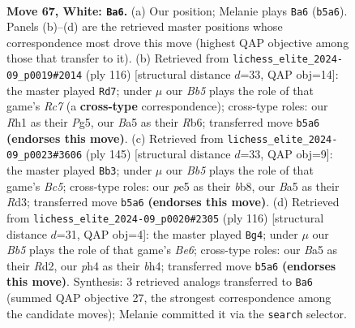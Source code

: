 \documentclass[11pt]{article}
\begin{document}
\clearpage

\begin{figure}[p]\centering
\begin{subfigure}{0.46\textwidth}\centering
\resizebox{\linewidth}{!}{%
\newchessgame
\chessboard[
  setfen={1r6/4b1k1/1n1p3p/BB2p3/4P2p/5P2/5K2/7R w - - 3 67},
  showmover=false,
  pgfstyle=straightmove, color=movearrow, markmove={b5-a6}
]}
\caption{}
\end{subfigure}\hfill
\begin{subfigure}{0.46\textwidth}\centering
\resizebox{\linewidth}{!}{%
\newchessgame
\chessboard[
  setfen={8/2R5/1R1n2p1/p3kpP1/P7/1p1r4/6P1/6K1 w - - 10 59},
  showmover=false,
  pgfstyle=straightmove, color=movearrow, markmove={c7-d7}
]}
\caption{}
\end{subfigure}
\\[4pt]
\begin{subfigure}{0.46\textwidth}\centering
\resizebox{\linewidth}{!}{%
\newchessgame
\chessboard[
  setfen={1B6/6pk/5p2/8/2b3P1/3rPPK1/8/4R3 b - - 33 73},
  showmover=false,
  pgfstyle=straightmove, color=movearrow, markmove={c4-b3}
]}
\caption{}
\end{subfigure}\hfill
\begin{subfigure}{0.46\textwidth}\centering
\resizebox{\linewidth}{!}{%
\newchessgame
\chessboard[
  setfen={8/8/1r1pBkp1/4p3/4Pp1b/5P2/3R4/5K2 w - - 10 59},
  showmover=false,
  pgfstyle=straightmove, color=movearrow, markmove={e6-g4}
]}
\caption{}
\end{subfigure}
\caption{\textbf{Move 67, White: \texttt{Ba6}.} (a) Our position; Melanie plays \texttt{Ba6} (\texttt{b5a6}). Panels (b)--(d) are the retrieved master positions whose correspondence most drove this move (highest QAP objective among those that transfer to it). (b) Retrieved from \texttt{lichess\_elite\_2024-09\_p0019\#2014} (ply 116) [structural distance $d$=33, QAP obj=14]: the master played \texttt{Rd7}; under $\mu$ our \emph{Bb5} plays the role of that game's \emph{Rc7} (a \textbf{cross-type} correspondence); cross-type roles: our \emph{R}h1 as their \emph{P}g5, our \emph{B}a5 as their \emph{R}b6; transferred move \texttt{b5a6} \textbf{(endorses this move)}. (c) Retrieved from \texttt{lichess\_elite\_2024-09\_p0023\#3606} (ply 145) [structural distance $d$=33, QAP obj=9]: the master played \texttt{Bb3}; under $\mu$ our \emph{Bb5} plays the role of that game's \emph{Bc5}; cross-type roles: our \emph{p}e5 as their \emph{b}b8, our \emph{B}a5 as their \emph{R}d3; transferred move \texttt{b5a6} \textbf{(endorses this move)}. (d) Retrieved from \texttt{lichess\_elite\_2024-09\_p0020\#2305} (ply 116) [structural distance $d$=31, QAP obj=4]: the master played \texttt{Bg4}; under $\mu$ our \emph{Bb5} plays the role of that game's \emph{Be6}; cross-type roles: our \emph{B}a5 as their \emph{R}d2, our \emph{p}h4 as their \emph{b}h4; transferred move \texttt{b5a6} \textbf{(endorses this move)}. Synthesis: 3 retrieved analogs transferred to \texttt{Ba6} (summed QAP objective 27, the strongest correspondence among the candidate moves); Melanie committed it via the \texttt{search} selector.}
\label{fig:thought-m132}
\end{figure}
\end{document}
